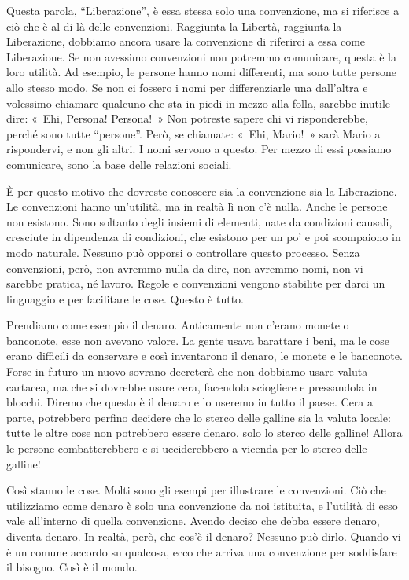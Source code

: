 Questa parola, ``Liberazione'', è essa stessa solo una convenzione, ma
si riferisce a ciò che è al di là delle convenzioni. Raggiunta la
Libertà, raggiunta la Liberazione, dobbiamo ancora usare la convenzione
di riferirci a essa come Liberazione. Se non avessimo convenzioni non
potremmo comunicare, questa è la loro utilità. Ad esempio, le persone
hanno nomi differenti, ma sono tutte persone allo stesso modo. Se non ci
fossero i nomi per differenziarle una dall'altra e volessimo chiamare
qualcuno che sta in piedi in mezzo alla folla, sarebbe inutile dire:
«~Ehi, Persona! Persona!~» Non potreste sapere chi vi risponderebbe,
perché sono tutte ``persone''. Però, se chiamate: «~Ehi, Mario!~» sarà
Mario a rispondervi, e non gli altri. I nomi servono a questo. Per mezzo
di essi possiamo comunicare, sono la base delle relazioni sociali.

È per questo motivo che dovreste conoscere sia la convenzione sia la
Liberazione. Le convenzioni hanno un'utilità, ma in realtà lì non c'è
nulla. Anche le persone non esistono. Sono soltanto degli insiemi di
elementi, nate da condizioni causali, cresciute in dipendenza di
condizioni, che esistono per un po' e poi scompaiono in modo naturale.
Nessuno può opporsi o controllare questo processo. Senza convenzioni,
però, non avremmo nulla da dire, non avremmo nomi, non vi sarebbe
pratica, né lavoro. Regole e convenzioni vengono stabilite per darci un
linguaggio e per facilitare le cose. Questo è tutto.

Prendiamo come esempio il denaro. Anticamente non c'erano monete o
banconote, esse non avevano valore. La gente usava barattare i beni, ma
le cose erano difficili da conservare e così inventarono il denaro, le
monete e le banconote. Forse in futuro un nuovo sovrano decreterà che
non dobbiamo usare valuta cartacea, ma che si dovrebbe usare cera,
facendola sciogliere e pressandola in blocchi. Diremo che questo è il
denaro e lo useremo in tutto il paese. Cera a parte, potrebbero perfino
decidere che lo sterco delle galline sia la valuta locale: tutte le
altre cose non potrebbero essere denaro, solo lo sterco delle galline!
Allora le persone combatterebbero e si ucciderebbero a vicenda per lo
sterco delle galline!

Così stanno le cose. Molti sono gli esempi per illustrare le
convenzioni. Ciò che utilizziamo come denaro è solo una convenzione da
noi istituita, e l'utilità di esso vale all'interno di quella
convenzione. Avendo deciso che debba essere denaro, diventa denaro. In
realtà, però, che cos'è il denaro? Nessuno può dirlo. Quando vi è un
comune accordo su qualcosa, ecco che arriva una convenzione per
soddisfare il bisogno. Così è il mondo.


